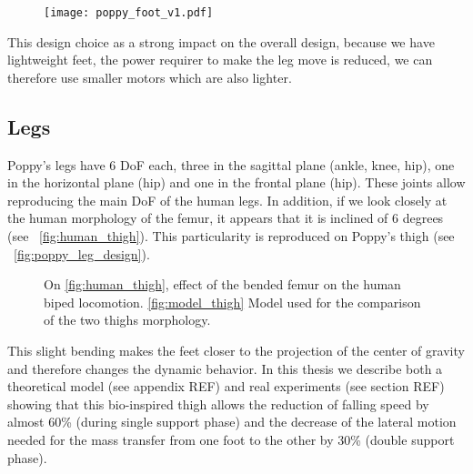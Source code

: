 



\begin{figure}[p]
    \begin{center}
        \texttt{[image: poppy\_foot\_v1.pdf]}
    \end{center}
    \caption{}
    \label{fig:poppy-foot-v1-design}
\end{figure}


This design choice as a strong impact on the overall design, because we have lightweight feet, the power requirer to make the leg move is reduced, we can therefore use smaller motors which are also lighter.


\subsection{Legs} %

Poppy's legs have 6 DoF each, three in the sagittal plane (ankle, knee, hip), one in the horizontal plane (hip) and one in the frontal plane (hip). These joints allow reproducing the main DoF of the human legs. In addition, if we look closely at the human morphology of the femur, it appears that it is inclined of 6 degrees (see \figurename~\ref{fig:human_thigh}). This particularity is reproduced on Poppy's thigh (see \figurename~\ref{fig:poppy_leg_design}).

\begin{figure}[tb]
\centering
    \hfil
    \caption{ On \ref{fig:human_thigh}, effect of the bended femur on the human biped locomotion. \ref{fig:model_thigh} Model used for the comparison of the two thighs morphology.}
    \label{fig:poppy_thigh}
\end{figure}


This slight bending makes the feet closer to the projection of the center of gravity and therefore changes the dynamic behavior.
In this thesis we describe both a theoretical model (see appendix REF) and real experiments (see section REF) showing that this bio-inspired thigh allows the reduction of falling speed by almost 60\% (during single support phase) and the decrease of the lateral motion needed for the mass transfer from one foot to the other by 30\% (double support phase).


